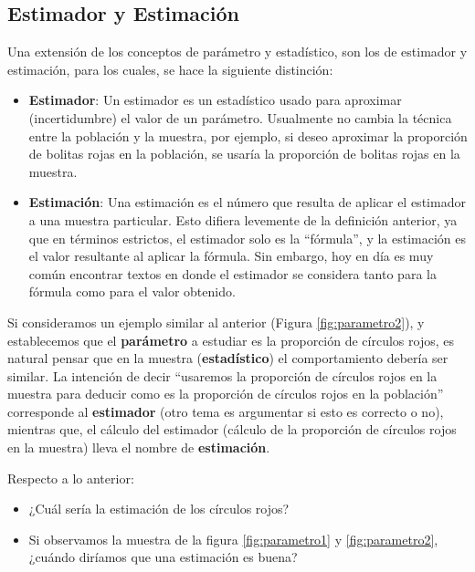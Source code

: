 \documentclass[
]{book}
\providecommand{\tightlist}{%
  \setlength{\itemsep}{0pt}\setlength{\parskip}{0pt}}
\begin{document}
\hypertarget{estimador-y-estimaciuxf3n}{%
\subsection{Estimador y Estimación}\label{estimador-y-estimaciuxf3n}}

Una extensión de los conceptos de parámetro y estadístico, son los de estimador y estimación, para los cuales, se hace la siguiente distinción:

\begin{itemize}
\item
  \textbf{Estimador}: Un estimador es un estadístico usado para aproximar (incertidumbre) el valor de un parámetro. Usualmente no cambia la técnica entre la población y la muestra, por ejemplo, si deseo aproximar la proporción de bolitas rojas en la población, se usaría la proporción de bolitas rojas en la muestra.
\item
  \textbf{Estimación}: Una estimación es el número que resulta de aplicar el estimador a una muestra particular. Esto difiera levemente de la definición anterior, ya que en términos estrictos, el estimador solo es la ``fórmula'', y la estimación es el valor resultante al aplicar la fórmula. Sin embargo, hoy en día es muy común encontrar textos en donde el estimador se considera tanto para la fórmula como para el valor obtenido.
\end{itemize}

Si consideramos un ejemplo similar al anterior (Figura \ref{fig:parametro2}), y establecemos que el \textbf{parámetro} a estudiar es la proporción de círculos rojos, es natural pensar que en la muestra (\textbf{estadístico}) el comportamiento debería ser similar. La intención de decir ``usaremos la proporción de círculos rojos en la muestra para deducir como es la proporción de círculos rojos en la población'' corresponde al \textbf{estimador} (otro tema es argumentar si esto es correcto o no), mientras que, el cálculo del estimador (cálculo de la proporción de círculos rojos en la muestra) lleva el nombre de \textbf{estimación}.

Respecto a lo anterior:

\begin{itemize}
\tightlist
\item
  ¿Cuál sería la estimación de los círculos rojos?
\item
  Si observamos la muestra de la figura \ref{fig:parametro1} y \ref{fig:parametro2}, ¿cuándo diríamos que una estimación es buena?
\end{itemize}
\end{document}
